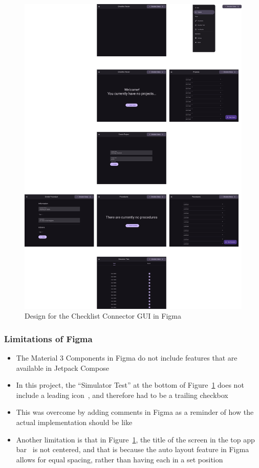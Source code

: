\documentclass[../dissertation.tex]{subfiles}
\begin{document}
\begin{figure}
  \centering
  \includegraphics[width=\columnwidth]{images/figma-gui.pdf}
  \caption[GUI in Figma]{Design for the Checklist Connector GUI in Figma}
  \label{fig:figma-gui}
\end{figure}

\subsubsection{Limitations of Figma}
\begin{itemize}
  \item The Material 3 Components in Figma do not include features that are available in
    Jetpack Compose
  \item In this project, the \enquote{Simulator Test} at the bottom of Figure~\ref{fig:figma-gui}
    does not include a leading icon~\cite{material:lists}, and therefore had to be a trailing
    checkbox
  \item This was overcome by adding comments in Figma as a reminder of how the actual implementation
    should be like
  \item Another limitation is that in Figure~\ref{fig:figma-gui}, the title of the screen in the
    top app bar~\cite{material:top-app-bar} is not centered, and that is because the auto layout
    feature in Figma allows for equal spacing, rather than having each in a set position
\end{itemize}
\end{document}
